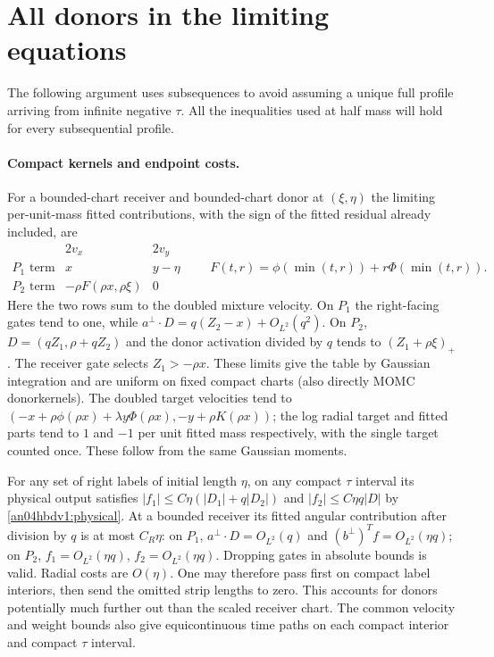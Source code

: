 \documentclass[11pt]{article}
\begin{document}
\section{All donors in the limiting equations}
The following argument uses subsequences to avoid assuming a unique
full profile arriving from infinite negative $\tau$. All the inequalities
used at half mass will hold for every subsequential profile.

\paragraph{Compact kernels and endpoint costs.}
For a bounded-chart receiver and bounded-chart donor at
$(\xi,\eta)$ the limiting per-unit-mass fitted contributions,
with the sign of the fitted residual already included, are
\[
\begin{array}{c|cc}
 &2v_x&2v_y\\ \hline
 P_1\text{ term}&x&y-\eta\\
 P_2\text{ term}&-\rho F(\rho x,\rho\xi)&0
\end{array}
\qquad
 F(t,r)=\phi(\min(t,r))+r\Phi(\min(t,r)).
\]
Here the two rows sum to the doubled mixture velocity.
On $P_1$ the right-facing gates tend to one, while
$a^\perp\cdot D=q(Z_2-x)+O_{L^2}(q^2)$.
On $P_2$, $D=(qZ_1,\rho+qZ_2)$ and the donor activation divided by
$q$ tends to $(Z_1+\rho\xi)_+$. The receiver gate selects
$Z_1>-\rho x$. These limits give the table by Gaussian integration
and are uniform on fixed compact charts (also directly MOMC
donorkernels). The doubled target velocities tend to
$(-x+\rho\phi(\rho x)+\lambda y\Phi(\rho x),
-y+\rho K(\rho x))$; the log radial target and fitted parts tend to
$1$ and $-1$ per unit fitted mass respectively, with the single
target counted once. These follow from the same Gaussian moments.

For any set of right labels of initial length $\eta$, on any compact
$\tau$ interval its physical output satisfies
$|f_1|\le C\eta(|D_1|+q|D_2|)$ and $|f_2|\le C\eta q|D|$ by
\eqref{an04hbdv1:physical}. At a bounded receiver its fitted angular
contribution after division by $q$ is at most $C_R\eta$:
on $P_1$, $a^\perp\cdot D=O_{L^2}(q)$ and
$(b^\perp)^Tf=O_{L^2}(\eta q)$; on $P_2$, $f_1=O_{L^2}(\eta q)$,
$f_2=O_{L^2}(\eta q)$. Dropping gates in absolute bounds is valid.
Radial costs are $O(\eta)$. One may therefore pass first on compact
label interiors, then send the omitted strip lengths to zero. This
accounts for donors potentially much further out than the scaled
receiver chart. The common velocity and weight bounds also give
equicontinuous time paths on each compact interior and compact
$\tau$ interval.
\end{document}
